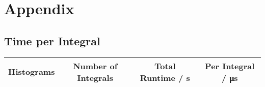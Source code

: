 

\renewcommand\thechapter{A}
\chapter{Appendix}

\section*{Time per Integral}
\begin{table}
	\centering
	\begin{tabular}{ S S S S }
		\toprule
		{Histograms} & {Number of Integrals} & {Total Runtime / \si{\second}} & {Per Integral / \si{\micro\second}} \\
		\midrule
		

\end{tabular}
\end{table}
